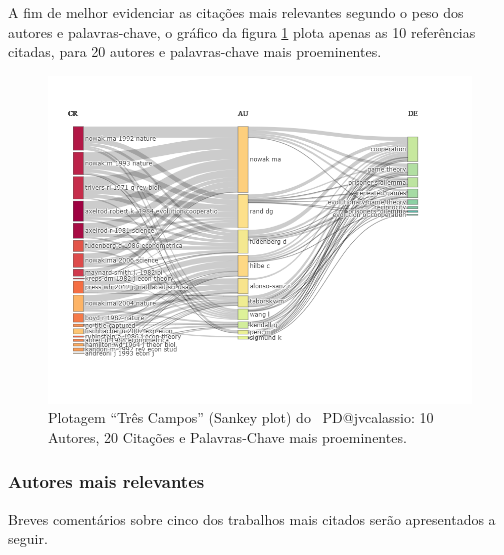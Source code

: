 A fim de melhor evidenciar as citações mais relevantes segundo o peso dos autores e palavras-chave, o gráfico da figura \ref{fig:PD@jvcalassio:ThreeFieldPlot:10-20-20} plota apenas as 10 referências citadas, para 20 autores e palavras-chave mais proeminentes.

\begin{figure}
    \centering
    \includegraphics[angle=0,width=1\textwidth]{exploratory-data-analysis/jvcalassio/PesqBibliogr/PrisonersDilemma/WoS-20221201/Dataset/ThreeFieldPlot-102020-2022-12-02.png}
    \caption{Plotagem ``Três Campos'' (Sankey plot) do \dataset\   PD@jvcalassio: 10 Autores, 20 Citações e Palavras-Chave mais proeminentes.}
    \label{fig:PD@jvcalassio:ThreeFieldPlot:10-20-20}
\end{figure}

\subsubsection{Autores mais relevantes\label{PD@jvcalassio:Sankey:AutoresRelevantes}}

Breves comentários sobre cinco dos trabalhos mais citados serão apresentados a seguir.

